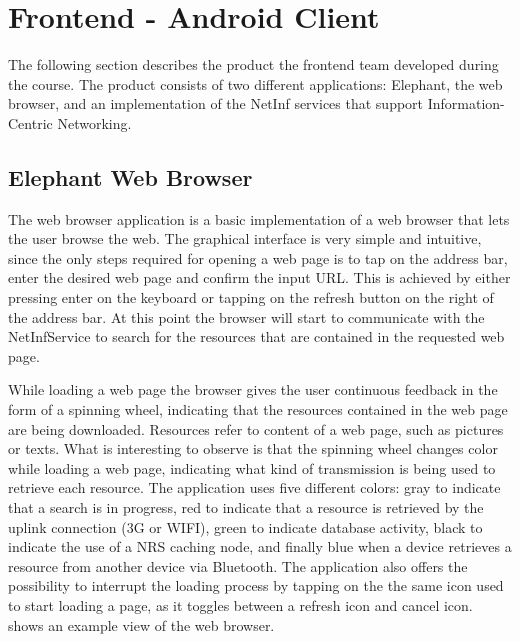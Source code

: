 \section {Frontend - Android Client}
The following section describes the product the frontend team developed during the course.
The product consists of two different applications: Elephant, the web browser, and an implementation
of the NetInf services that support Information-Centric Networking.

\subsection{Elephant Web Browser}
\label{sec:Elephant Web Browser}
The web browser application is a basic implementation of a web browser that lets the user browse
the web. The graphical interface is very simple and intuitive, since the only steps required for
opening a web page is to tap on the address bar, enter the desired web page and confirm the input URL.
This is achieved by either pressing enter on the keyboard or tapping on the refresh button on the right
of the address bar. At this point the browser will start to communicate with the NetInfService to
search for the resources that are contained in the requested web page.

While loading a web page the browser gives the user continuous feedback in the form of a spinning wheel,
indicating that the resources contained in the web page are being downloaded.
Resources refer to content of a web page, such as pictures or texts.
What is interesting to observe is that the spinning wheel changes color while loading a web page,
indicating what kind of transmission is being used to retrieve each resource.
The application uses five different colors: gray to indicate that a search is in progress, red to indicate
that a resource is retrieved by the uplink connection (3G or WIFI), green to indicate database activity,
black to indicate the use of a NRS caching node, and finally blue when a device retrieves a resource from
another device via Bluetooth. The application also offers the possibility to interrupt the
loading process by tapping on the the same icon used to start loading a page, as it toggles between a refresh
icon and cancel icon.  shows an example view of the web browser.\\

